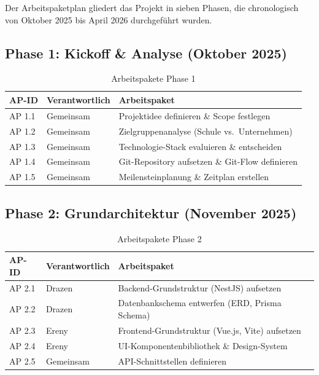 Der Arbeitspaketplan gliedert das Projekt in sieben Phasen, die
chronologisch von Oktober 2025 bis April 2026 durchgeführt wurden.

\subsection{Phase 1: Kickoff \& Analyse (Oktober 2025)}

\begin{table}[H]
    \centering
    \caption{Arbeitspakete Phase 1}
    \begin{tabularx}{\textwidth}{llX}
        \toprule
        \textbf{AP-ID} & \textbf{Verantwortlich} & \textbf{Arbeitspaket} \\
        \midrule
        AP 1.1 & Gemeinsam & Projektidee definieren \& Scope festlegen \\
        AP 1.2 & Gemeinsam & Zielgruppenanalyse (Schule vs.\ Unternehmen) \\
        AP 1.3 & Gemeinsam & Technologie-Stack evaluieren \& entscheiden \\
        AP 1.4 & Gemeinsam & Git-Repository aufsetzen \& Git-Flow definieren \\
        AP 1.5 & Gemeinsam & Meilensteinplanung \& Zeitplan erstellen \\
        \bottomrule
    \end{tabularx}
    \label{tab:ap1}
\end{table}

\subsection{Phase 2: Grundarchitektur (November 2025)}

\begin{table}[H]
    \centering
    \caption{Arbeitspakete Phase 2}
    \begin{tabularx}{\textwidth}{llX}
        \toprule
        \textbf{AP-ID} & \textbf{Verantwortlich} & \textbf{Arbeitspaket} \\
        \midrule
        AP 2.1 & Drazen & Backend-Grundstruktur (NestJS) aufsetzen \\
        AP 2.2 & Drazen & Datenbankschema entwerfen (\gls{ERD}, Prisma Schema) \\
        AP 2.3 & Ereny  & Frontend-Grundstruktur (Vue.js, Vite) aufsetzen \\
        AP 2.4 & Ereny  & UI-Komponentenbibliothek \& Design-System \\
        AP 2.5 & Gemeinsam & API-Schnittstellen definieren \\
        \bottomrule
    \end{tabularx}
    \label{tab:ap2}
\end{table}


